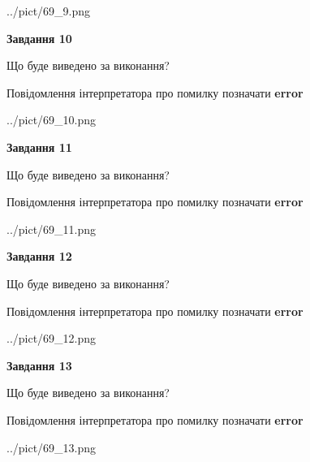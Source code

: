 \documentclass[11pt, ukrainian]{article}
\begin{document}
{\begin {large}
\begin{center}
	{../pict/69_9.png}
\end{center}
\newpage

{\begin {center}\textbf{Завдання 10}\end {center}}\par
Що буде виведено за виконання? \par
Повідомлення інтерпретатора про помилку позначати \textbf{error}

\begin{center}
	{../pict/69_10.png}
\end{center}
\newpage

{\begin {center}\textbf{Завдання 11}\end {center}}\par
Що буде виведено за виконання? \par
Повідомлення інтерпретатора про помилку позначати \textbf{error}

\begin{center}
	{../pict/69_11.png}
\end{center}
\newpage

{\begin {center}\textbf{Завдання 12}\end {center}}\par
Що буде виведено за виконання? \par
Повідомлення інтерпретатора про помилку позначати \textbf{error}

\begin{center}
	{../pict/69_12.png}
\end{center}
\newpage

{\begin {center}\textbf{Завдання 13}\end {center}}\par
Що буде виведено за виконання? \par
Повідомлення інтерпретатора про помилку позначати \textbf{error}

\begin{center}
	{../pict/69_13.png}
\end{center}
\newpage


\end{large}}
\end{document}
